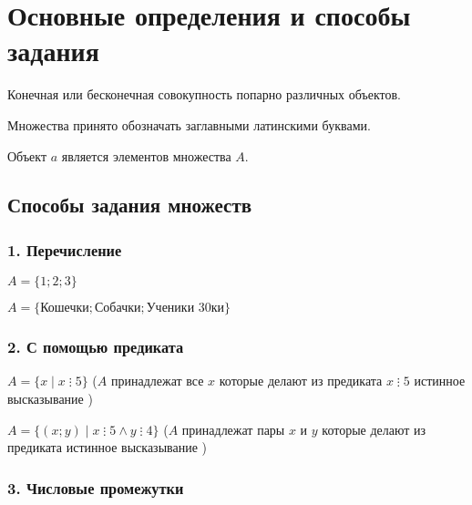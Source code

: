 \section{Основные определения и способы задания}

\begin{definition}[Множество]
	Конечная или бесконечная совокупность попарно различных объектов.
\end{definition}

\begin{remark}
	Множества принято обозначать заглавными латинскими буквами.
\end{remark}

\begin{definition}[$a \in A$]
	Объект $a$ является элементов множества $A$.
\end{definition}

\subsection{Способы задания множеств}

\subsubsection{1. Перечисление}

\begin{example}
	$A = \{1; 2; 3\}$
\end{example}

\begin{example}
	$A = \{\text{Кошечки}; \text{Собачки}; \text{Ученики 30ки}\}$
\end{example}

\subsubsection{2. С помощью предиката}

\begin{example}
	$A = \{x \mid x \; \vdots \; 5\}$ ($A$ принадлежат все $x$ которые делают из предиката $x \; \vdots \; 5$ истинное высказывание )
\end{example}

\begin{example}
	$A = \{(x; y) \mid x \; \vdots \; 5 \land y \; \vdots \; 4\}$ ($A$ принадлежат пары $x$ и $y$ которые делают из предиката истинное высказывание )
\end{example}

\subsubsection{3. Числовые промежутки}

